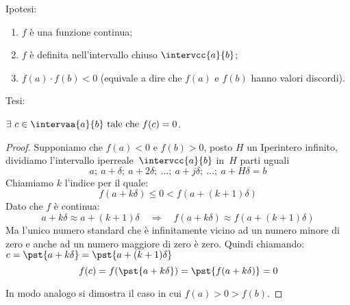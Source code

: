 \noindent Ipotesi:
\begin{enumerate}[nosep]
 \item \(f\) è una funzione continua;
 \item \(f\) è definita nell'intervallo chiuso \(\intervcc{a}{b}\);
 \item \(f(a) \cdot f(b) < 0\) 
 (equivale a dire che \(f(a)\) e \(f(b)\) hanno valori discordi).
\end{enumerate}

\noindent Tesi: 

\(\exists~c \in \intervaa{a}{b} \text{ tale che } f(c)=0\).


\begin{proof}
Supponiamo che \(f(a)<0\) e \(f(b)>0\), posto \(H\) un Iperintero 
infinito, dividiamo l'intervallo iperreale~\(\intervcc{a}{b}\) in~\(H\) 
parti uguali
\[a;~a+\delta;~a+2\delta;~\dots;~a+j\delta;~\dots;~a+H\delta=b\]
Chiamiamo \(k\) l'indice per il quale:
\[f(a+k\delta) \leqslant 0 < f(a+(k+1)\delta)\]
Dato che \(f\) è continua:
\[a+k\delta \approx a+(k+1)\delta \quad \Rightarrow \quad 
f(a+k\delta) \approx f(a+(k+1)\delta)\] 
Ma l'unico numero standard che è infinitamente vicino ad un numero
minore di zero e anche ad un numero maggiore di zero è zero. 
Quindi chiamando:\(c=\pst{a+k\delta}=\pst{a+(k+1)\delta}\)
\[f(c)=f(\pst{a+k\delta})=\pst{f(a+k\delta)}=0\]

In modo analogo si dimostra il caso in cui \(f(a)>0>f(b)\).
\end{proof}

